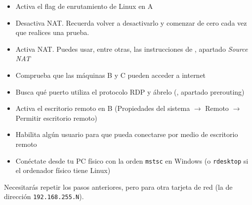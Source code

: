 \begin{homeworkProblem}
  \begin{itemize}
  \item Activa el flag de enrutamiento de Linux en A
  \item Desactiva NAT. Recuerda volver a desactivarlo y comenzar de cero cada vez que realices una prueba.
    \begin{comment}
      iptables -t nat –F
    \end{comment}
  \item Activa NAT. Puedes usar, entre otras, las instrucciones de , apartado \textit{Source NAT}
  \item Comprueba que las máquinas B y C pueden acceder a internet
  \end{itemize}
\end{homeworkProblem}

\begin{homeworkProblem}
  \begin{itemize}
    
  \item Busca qué puerto utiliza el protocolo RDP y ábrelo (, apartado prerouting)
  \item Activa el escritorio remoto en B (Propiedades del sistema $\rightarrow$ Remoto $\rightarrow$ Permitir escritorio remoto)
    
  \item Habilita algún usuario para que pueda conectarse por medio de escritorio remoto
  \item Conéctate desde tu PC físico con la orden \texttt{mstsc} en  Windows (o \texttt{rdesktop} si el ordenador físico tiene Linux)
  \end{itemize}

\end{homeworkProblem}


\begin{homeworkProblem}
  Necesitarás repetir los pasos anteriores, pero para otra tarjeta de red (la de dirección \texttt{192.168.255.N}).
\end{homeworkProblem}



